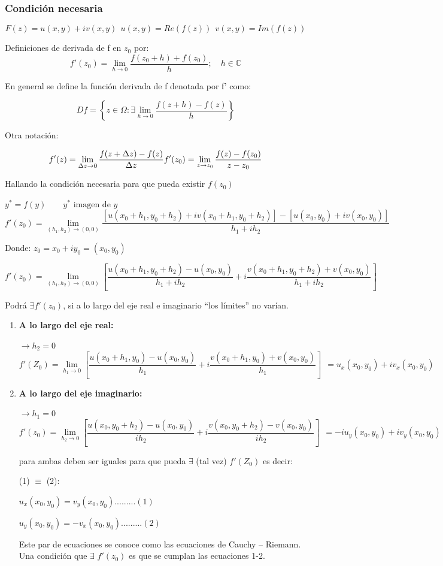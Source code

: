\documentclass[a4paper,12pt]{article}
\begin{document}
\subsubsection{Condición necesaria}

\[
F(z) = u (x,y) + iv(x,y) \ \
u (x,y) = Re (f(z)) \ \
v(x,y) = Im(f(z))
\]


Definiciones de derivada de f en $z_0$ por:
\[
f'(z_0) = \lim_{h \rightarrow 0} \frac{f(z_0 + h) + f(z_0)}{h}; \quad h \in \mathbb{C}
\]

En general se define la función derivada de f denotada por f' como:


\[
Df = \left\{ z \in \Omega : \exists \lim_{h \rightarrow 0} \frac{f(z + h) - f(z)}{h} \right\}
\]

Otra notación:

\[
f'(z) = \lim_{\Delta z \rightarrow 0} \frac{f(z + \Delta z) - f(z)}{\Delta z} \\
f'(z_0) = \lim_{z \rightarrow z_0} \frac{f(z) - f(z_0)}{z - z_0}
\]


Hallando la condición necesaria para que pueda existir $f(z_0)$


$y^* = f(y) \quad \quad y^* \text{ imagen de } y$
\[
f'(z_0) = \lim_{(h_1, h_2) \rightarrow (0,0)} \frac{\left[ u(x_0 + h_1, y_0 + h_2) + i v(x_0 + h_1, y_0 + h_2) \right] - \left[ u(x_0, y_0) + i v(x_0, y_0) \right]}{h_1 + ih_2}
\]


Donde: $z_0 = x_0 + iy_0 = (x_0, y_0)$

\[
f'(z_0) = \lim_{(h_1, h_2) \rightarrow (0,0)} \left[ \frac{u(x_0 + h_1, y_0 + h_2) - u(x_0, y_0)}{h_1 + ih_2} + i \frac{v(x_0 + h_1, y_0 + h_2) + v(x_0, y_0)}{h_1 + ih_2} \right]
\]


Podrá $\exists f'(z_0)$, si a lo largo del eje real e imaginario “los límites” no varían.

\begin{enumerate}
    \item \textbf{A lo largo del eje real:}

$\rightarrow h_2 = 0$
\[
f'(Z_0) = \lim_{h_1 \rightarrow 0} \left[ \frac{u(x_0 + h_1, y_0) - u(x_0, y_0)}{h_1} + i \frac{v(x_0 + h_1, y_0) + v(x_0, y_0)}{h_1} \right] \ \
= u_x(x_0, y_0) + iv_x(x_0, y_0)
\]


\item  \textbf{A lo largo del eje imaginario:}

$\rightarrow h_1 = 0$
\[
f'(z_0) = \lim_{h_2 \rightarrow 0} \left[ \frac{u(x_0, y_0 + h_2) - u(x_0, y_0)}{ih_2} + i \frac{v(x_0, y_0 + h_2) - v(x_0, y_0)}{ih_2} \right] \ \
= -i u_y(x_0, y_0) + iv_y(x_0, y_0)
\]

para ambas deben ser iguales para que pueda $\exists$ (tal vez) $f'(Z_0)$ es decir:

(1) $\equiv$ (2):

$u_x(x_0, y_0) = v_y(x_0, y_0).........(1)$

$u_y(x_0, y_0) = -v_x(x_0, y_0).........(2)$

Este par de ecuaciones se conoce como las ecuaciones de Cauchy – Riemann. Una condición que $\exists$ $f'(z_0)$ es que se cumplan las ecuaciones 1-2.
\end{enumerate}
\end{document}
